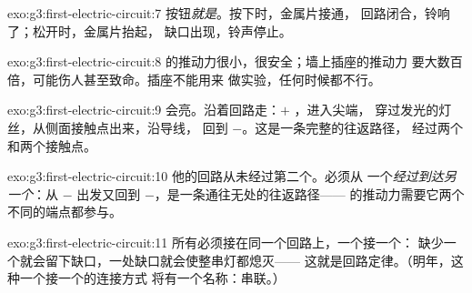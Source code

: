 \begin{solution}{exo:g3:first-electric-circuit:7}
按钮\emph{就是}。按下时，金属片接通，
回路闭合，铃响了；松开时，金属片抬起，
缺口出现，铃声停止。
\end{solution}

\begin{solution}{exo:g3:first-electric-circuit:8}
的推动力很小，很安全；墙上插座的推动力
要大数百倍，可能伤人甚至致命。插座不能用来
做实验，任何时候都不行。
\end{solution}

\begin{solution}{exo:g3:first-electric-circuit:9}
会亮。沿着回路走：$+$ ，进入尖端，
穿过发光的灯丝，从侧面接触点出来，沿导线，
回到 $-$。这是一条完整的往返路径，
经过两个和两个接触点。
\end{solution}

\begin{solution}{exo:g3:first-electric-circuit:10}
他的回路从未经过第二个。必须从
一个\emph{经过到达另一个}：从
$-$ 出发又回到 $-$，是一条通往无处的往返路径——
的推动力需要它两个不同的端点都参与。
\end{solution}

\begin{solution}{exo:g3:first-electric-circuit:11}
所有必须接在同一个回路上，一个接一个：
缺少一个就会留下缺口，一处缺口就会使整串灯都熄灭——
这就是回路定律。（明年，这种一个接一个的连接方式
将有一个名称：串联。）
\end{solution}
